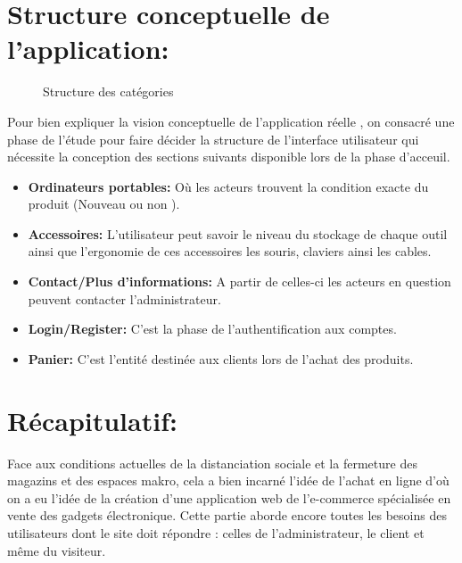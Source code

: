 \documentclass[a4paper]{report}
\begin{document}
\begin{doublespace}
\begin{doublespace}
\begin{doublespace}
\begin{doublespace}
                \section{Structure conceptuelle de l'application:}
                \begin{figure}[H]
                    \begin{center}
                        \caption{Structure des catégories}
                    \end{center}
                \end{figure}
                Pour bien expliquer la vision conceptuelle de l'application
                réelle , on consacré une phase de l'étude pour faire décider la structure de
                l'interface utilisateur  qui nécessite la conception des  sections suivants
                disponible lors de la phase d'acceuil.
                \begin{itemize}
                    \item \textbf{Ordinateurs portables:} Où les acteurs
                          trouvent la condition exacte du produit (Nouveau ou non ).
                    \item \textbf{Accessoires:} L'utilisateur peut savoir
                          le niveau du stockage de chaque outil ainsi que l'ergonomie de ces accessoires
                          les souris, claviers ainsi les cables.
                    \item \textbf{Contact/Plus d'informations:} A partir de
                          celles-ci les acteurs en question peuvent contacter l'administrateur.
                    \item \textbf{Login/Register:} C'est la phase de
                          l'authentification aux comptes.
                    \item \textbf{Panier:} C'est l'entité destinée aux
                          clients lors de l'achat des produits.

                \end{itemize}

                \newpage
                \section{Récapitulatif:}
                Face aux conditions actuelles de la distanciation sociale
                et la fermeture des magazins et des espaces makro, cela a bien incarné l'idée
                de l'achat en ligne d'où on a eu l'idée de la création d’une application web de
                l'e-commerce spécialisée en vente des gadgets électronique. Cette partie aborde
                encore toutes les besoins des utilisateurs dont le site doit répondre : celles
                de l’administrateur, le client	et même du visiteur.


\end{doublespace}
\end{doublespace}
\end{doublespace}
\end{doublespace}
\end{document}

